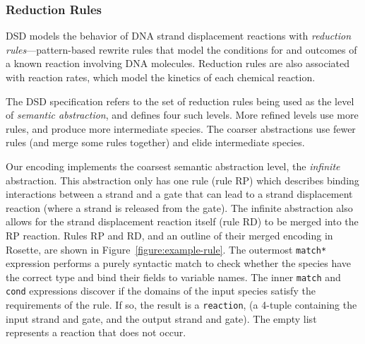 \documentclass{article}[10pt]
\begin{document}
\subsubsection{Reduction Rules}
DSD models the behavior of DNA strand displacement reactions with
\emph{reduction rules}---pattern-based rewrite rules
that model the conditions for and outcomes of a known reaction
involving DNA molecules. Reduction rules are also associated with
reaction rates, which model the kinetics of each chemical reaction.

The DSD specification refers to the set of reduction rules being used
as the level of \emph{semantic abstraction}, and defines four such levels.
More refined levels
use more rules, and produce more intermediate species. The
coarser abstractions use fewer rules (and merge some rules together) and
elide intermediate species.

Our encoding implements the coarsest semantic abstraction level,
the \emph{infinite} abstraction. This abstraction only has one
rule (rule RP) which describes binding interactions between a strand and a gate
that can lead to a strand displacement reaction (where a strand is
released from the gate). The infinite abstraction also allows for the strand
displacement reaction itself (rule RD)
to be merged into the RP reaction.
Rules RP and RD, and an outline of their merged encoding in Rosette, are shown in
Figure~\ref{figure:example-rule}. The outermost \verb;match*; expression
performs a purely syntactic match to check whether the species have
the correct type and bind their fields to variable names.
The inner \verb;match; and \verb;cond;
expressions discover if the domains of the input species satisfy
the requirements of the rule. If so, the result is a \verb;reaction;,
(a 4-tuple containing the input strand and gate, and the
output strand and gate). The empty list represents a reaction that
does not occur.
\end{document}
